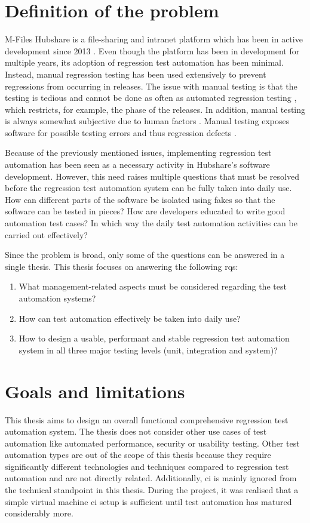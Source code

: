 \section{Definition of the problem}
M-Files Hubshare is a file-sharing and intranet platform which has been in active development since 2013 \cite{mfiles2022Hubshare,hubshare2020}. Even though the platform has been in development for multiple years, its adoption of regression test automation has been minimal. Instead, manual regression testing has been used extensively to prevent regressions from occurring in releases. The issue with manual testing is that the testing is tedious and cannot be done as often as automated regression testing \cite{akin2018transitioning}, which restricts, for example, the phase of the releases. In addition, manual testing is always somewhat subjective due to human factors \cite{akin2018transitioning}. Manual testing exposes software for possible testing errors and thus regression defects \cite{garousi2016developing}.

Because of the previously mentioned issues, implementing regression test automation has been seen as a necessary activity in Hubshare's software development. However, this need raises multiple questions that must be resolved before the regression test automation system can be fully taken into daily use. How can different parts of the software be isolated using fakes so that the software can be tested in pieces? How are developers educated to write good automation test cases? In which way the daily test automation activities can be carried out effectively?

Since the problem is broad, only some of the questions can be answered in a single thesis. This thesis focuses on answering the following \glspl{rq}:
\begin{enumerate}[label=RQ\arabic*,noitemsep]
	\item\label{rq1} What management-related aspects must be considered regarding the test automation systems?
	\item\label{rq2} How can test automation effectively be taken into daily use?
	\item\label{rq3} How to design a usable, performant and stable regression test automation system in all three major testing levels (unit, integration and system)?
\end{enumerate}

\section{Goals and limitations}\label{section:goals_and_limitations}
This thesis aims to design an overall functional comprehensive regression test automation system. The thesis does not consider other use cases of test automation like automated performance, security or usability testing. Other test automation types are out of the scope of this thesis because they require significantly different technologies and techniques compared to regression test automation and are not directly related. Additionally, \gls{ci} is mainly ignored from the technical standpoint in this thesis. During the project, it was realised that a simple virtual machine \gls{ci} setup is sufficient until test automation has matured considerably more.

